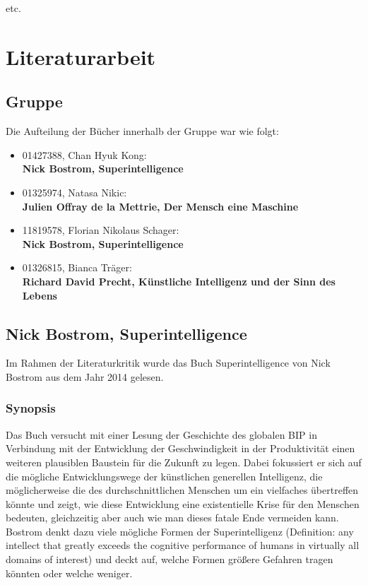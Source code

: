 \documentclass[twoside, a4paper, DIV=11, open=any, bibliography=totoc]{scrbook}
\begin{document}
etc.

\chapter{Literaturarbeit} \label{chp:LitKrit}

\section{Gruppe} \label{sec:litgroup}

Die Aufteilung der Bücher innerhalb der Gruppe war wie folgt:

\begin{itemize}
    \item 01427388, Chan Hyuk Kong: \\ \textbf {Nick Bostrom, Superintelligence}
    \cite{B2}
    \item 01325974, Natasa Nikic: \\ \textbf {Julien Offray de la Mettrie, Der Mensch eine Maschine} \cite{B1}
    \item 11819578,  Florian Nikolaus Schager: \\ \textbf {Nick Bostrom, Superintelligence} \cite{B2}
    \item 01326815, Bianca Träger:  \\ \textbf {Richard David Precht, Künstliche Intelligenz und der Sinn des Lebens} \cite{B3}
\end{itemize}


\section{Nick Bostrom, Superintelligence} \label{sec:litb1}

Im Rahmen der Literaturkritik wurde das Buch Superintelligence von Nick Bostrom aus dem Jahr 2014 gelesen.

\subsection{Synopsis} \label{sec:litsynops1}

Das Buch versucht mit einer Lesung der Geschichte des globalen BIP in Verbindung mit der Entwicklung der Geschwindigkeit in der Produktivität einen weiteren plausiblen Baustein für die Zukunft zu legen. Dabei fokussiert er sich auf die mögliche Entwicklungswege der künstlichen generellen Intelligenz, die möglicherweise die des durchschnittlichen Menschen um ein vielfaches übertreffen könnte und zeigt, wie diese Entwicklung eine existentielle Krise für den Menschen bedeuten, gleichzeitig aber auch wie man dieses fatale Ende vermeiden kann. Bostrom denkt dazu viele mögliche Formen der Superintelligenz (Definition: any intellect that greatly exceeds the cognitive performance of humans in virtually all domains of interest) und deckt auf, welche Formen größere Gefahren tragen könnten oder welche weniger.
\end{document}
